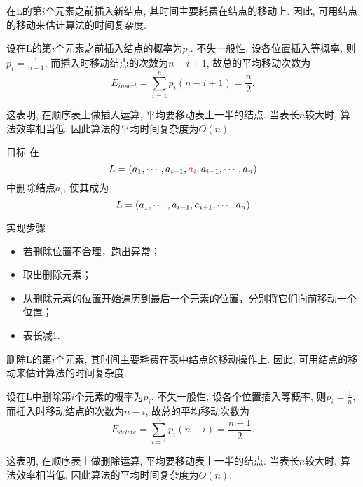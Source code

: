 \begin{frame}\ft{\subsecname}
在{\ttfamily L}的第$i$个元素之前插入新结点,  其时间主要耗费在结点的移动上. 因此,  可用结点的移动来估计算法的时间复杂度. \vspace{0.1in}

设在{\ttfamily L}的第$i$个元素之前插入结点的概率为$p_i$. 不失一般性,  设各位置插入等概率,  则$p_i=\frac1{n+1}$,  而插入时移动结点的次数为$n-i+1$,  故总的平均移动次数为
$$
E_{insert}=\sum_{i=1}^n p_i (n-i+1)=\frac n2.
$$\vspace{0.1in}

这表明,  在顺序表上做插入运算,  平均要移动表上一半的结点. 当表长$n$较大时,  算法效率相当低. 因此算法的平均时间复杂度为$O(n)$. 
\end{frame}

\begin{frame}\ft{\subsecname}
\begin{block}{目标}
在
$$
L=(a_1,\cdots,a_{i-1},\textcolor{red}{a_i},a_{i+1},\cdots,a_n)
$$
中删除结点$a_i$,  使其成为 
$$
L=(a_1,\cdots,a_{i-1},a_{i+1},\cdots,a_n)
$$
\end{block}
\pause 
\begin{block}{实现步骤}
\begin{itemize}
\item
  若删除位置不合理，跑出异常；
\item
  取出删除元素；
\item
  从删除元素的位置开始遍历到最后一个元素的位置，分别将它们向前移动一个位置；
\item
  表长减1.
\end{itemize}
\end{block}
\end{frame}


\begin{frame}[fragile]\ft{\subsecname}

\end{frame}


\begin{frame}\ft{\subsecname}
删除{\ttfamily L}的第$i$个元素,  其时间主要耗费在表中结点的移动操作上. 因此,  可用结点的移动来估计算法的时间复杂度. \vspace{0.1in}

设在{\ttfamily L}中删除第$i$个元素的概率为$p_i$,  不失一般性,  设各个位置插入等概率,  则$p_i=\frac1{n}$,  而插入时移动结点的次数为$n-i$,  故总的平均移动次数为
$$
E_{delete}=\sum_{i=1}^n p_i (n-i)=\frac {n-1}2.
$$\vspace{0.1in}

这表明,  在顺序表上做删除运算,  平均要移动表上一半的结点. 当表长$n$较大时,  算法效率相当低. 因此算法的平均时间复杂度为$O(n)$. 
\end{frame}

